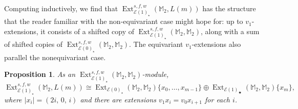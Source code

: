 \documentclass{amsart}
\newtheorem{proposition}[equation]{Proposition}
\theoremstyle{plain}
\numberwithin{equation}{section}
\numberwithin{figure}{section}
\DeclareMathOperator{\Ext}{Ext}
\newcommand{\mM}{{\mathbb M}}
\newcommand{\cE}{{\mathcal E}}
\newcommand{\0}{\langle 0 \rangle }
\begin{document}
Computing inductively, we find that $\Ext_{\cE(1)_{\star}}^{s,f,w}(\mM_{2}, L(m) )$ has the structure that the reader familiar with the non-equivariant case might hope for: up to $v_{1}$-extensions, it consists of a shifted copy of $\Ext_{\cE(1)_{\star}}^{s,f,w}(\mM_{2}, \mM_2 )$, along with a sum of shifted copies of $\Ext_{\cE(0)_{\star}}^{s,f,w}(\mM_{2}, \mM_{2} )$. The equivariant $v_{1}$-extensions also parallel the nonequivariant case.
\begin{proposition}\label{k:0}
As an $\Ext_{\cE(1)_{\star}}^{s,f,w}(\mM_{2}, \mM_{2} )$-module, 
\[\Ext_{\cE(1)_{\star}}^{s,f,w}(\mM_{2}, L(m) ) \cong \Ext_{\cE(0)_\star}(\mM_2, \mM_2)\{x_{0},\ldots, x_{m-1}\} \oplus  \Ext_{\cE(1)_\bigstar}(\mM_2, \mM_2) \{x_m\},\] 
where $|x_{i}| = (2i,\, 0,\, i)$ and there are extensions $v_{1}x_{i} = v_{0}x_{i+1}$ for each $i$. 
\end{proposition}
\end{document}

